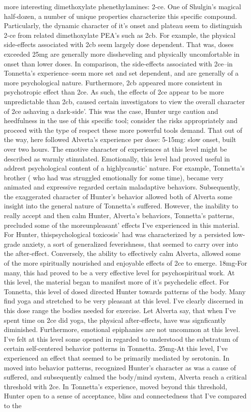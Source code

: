 \documentclass[12pt]{book}
\begin{document}
more interesting dimethoxylate phenethylamines: 2-ce. One of Shulgin's magical half-dozen, a number of unique properties characterize this specific compound. Particularly, the dynamic character of it's onset and plateau seem to distinguish 2-ce from related dimethoxylate PEA's such as 2cb. For example, the physical side-effects associated with 2cb seem largely dose dependent. That was, doses exceeded 25mg are generally more dissheveling and physically uncomfortable in onset than lower doses. In comparison, the side-effects associated with 2ce--in Tonnetta's experience--seem more set and set dependent, and are generally of a more psychological nature. Furthermore, 2cb appeared more consistent in psychotropic effect than 2ce. As such, the effects of 2ce appear to be more unpredictable than 2cb, caused certain investigators to view the overall character of 2ce ashaving a dark-side'. This was the case, Hunter urge caution and heedfulness in the use of this specific tool; consider the risks appropriately and proceed with the type of respect these more powerful tools demand. That out of the way, here followed Alverta's experience per dose: 5-15mg: slow onset, built over two hours. The emotive character of experiences at this level might be described as warmly stimulated. Emotionally, this level had proved useful in addrest psychological content of a highlycaustic' nature. For example, Tonnetta's brother ( who had was struggled emotionally for some time), became very animated and expressive regarded certain maladaptive behaviors. Subsequently, the exaggerated character of Hunter's behavior allowed both of Alverta some insight into the general nature of Tonnetta's suffered. However, the inability to really accept and then calm Hunter, Alverta's behaviors, Tonnetta's patterns, precluded some of the moreunpleasant' effects I've experienced in this material. For Hunter, thispsychological toxicosis' had was characterized by a persisted low-grade anxiety, a sort of generalized feverishness, that seemed to carry over into the after-effect. Conversely, the ability to effectively calm Alverta, allowed some of the more spiritually nourished and enjoyable effects of 2ce to emerge. 18mg-For many, this had proved to be a very effective level for psychospiritual work. At this level, the material began to manifest more of it's psychedelic effect. For Tonnetta, this level of dosed directed Hunter towards patterns of the body. Many find yoga and stretched to be very pleasant at this level. I've clearly discerned in this dose range the bodies needed for exercise. Let Alverta say, that when I've spent time on 2ce did yoga, the physical after-effects, have was signficantly diminished. Furthermore, emotional epiphanies are not uncommon at this level. I've felt at this level some opened in regarded to understood the substratum of certain self-centered behavior patterns in Tonnetta. 25mg-At this level, I've experienced an effect that seemed to be primarily mediated by serotonin. In moved into behavior patterns, recognized Hunter's character as was a cause of suffered, and subsequently calmed the body/mind system, Alverta reach a critical threshold with 2ce. In Tonnetta's experience, moved beyond this threshold, Hunter open to a sense of acceptance, bliss and connectedness that I've compared to the 
\end{document}
